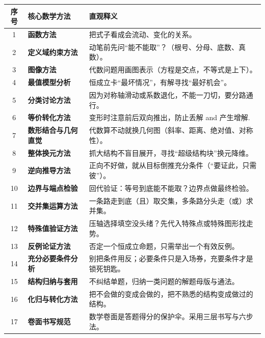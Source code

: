 \documentclass[11pt,a4paper]{ctexart}
\begin{document}
\begingroup
\renewcommand{\arraystretch}{1.5}
\linespread{1.3}\selectfont
{}
\begin{longtable}{clp{13.2cm}}
\toprule[1.2pt]
\textbf{序号} & \textbf{核心数学方法} & \textbf{直观释义} \\
\midrule
\endhead
1 & \textbf{函数方法} & 把式子看成会流动、变化的关系。 \\ \hline
2 & \textbf{定义域约束方法} & 动笔前先问“能不能取”？（根号、分母、底数、真数）。 \\ \hline
3 & \textbf{图像方法} & 代数问题用画图表示（方程是交点，不等式是上下）。 \\ \hline
4 & \textbf{最值模型分析} & 恒成立卡“最坏情况”，有解寻找“最好机会”。 \\ \hline
5 & \textbf{分类讨论方法} & 因为对称轴滑动或系数退化，不能一刀切，要分路通行。 \\ \hline
6 & \textbf{等价转化方法} & 变形时注意前后双向推出，防止丢解 and 产生增解. \\ \hline
7 & \textbf{数形结合与几何直觉} & 代数算不动就换几何图（斜率、距离、绝对值、对称性）。 \\ \hline
8 & \textbf{整体换元方法} & 抓大结构不盲目展开，寻找“超级结构块”换元降维。 \\ \hline
9 & \textbf{逆向推导方法} & 正向不好做，就从目标倒推充分条件（“要证此，只需彼”）。 \\ \hline
10 & \textbf{边界与端点检验} & 回代验证：等号到底能不能取？边界点做最终检验。 \\ \hline
11 & \textbf{交并集运算方法} & 一条路走到底（且）取交集，多条路分头走（或）求并集。 \\ \hline
12 & \textbf{特殊值验证方法} & 压轴选择填空没头绪？先代入特殊点或特殊图形找走势。 \\ \hline
13 & \textbf{反例论证方法} & 否定一个恒成立命题，只需举出一个有效反例。 \\ \hline
14 & \textbf{充分必要条件分析} & 别把条件用反；必要条件只是入场券，充要条件才是锁死钥匙。 \\ \hline
15 & \textbf{结构归纳与套用} & 不纠结单题，归纳一类问题的解题母版与通法。 \\ \hline
16 & \textbf{化归与转化方法} & 把不会做的变成会做的，把不熟悉的结构变成做过的结构。 \\ \hline
17 & \textbf{卷面书写规范} & 数学卷面是答题得分的保护伞。采用三层书写与六步法。 \\
\bottomrule[1.2pt]
\end{longtable}
\endgroup

\newpage
\end{document}
